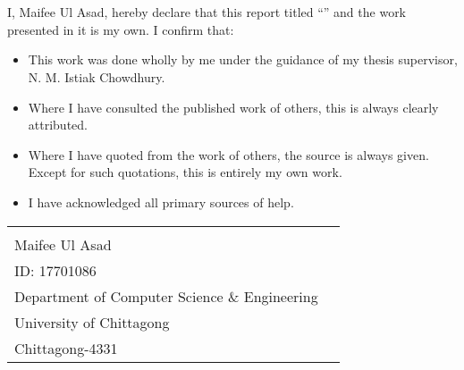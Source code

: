 

\chapter*{}

I, Maifee Ul Asad, hereby declare that this report titled “” and the work presented in it is my own. I confirm that:
\begin{itemize}
    \item This work was done wholly by me under the guidance of my thesis supervisor, N. M. Istiak Chowdhury.
    \item Where I have consulted the published work of others, this is always clearly attributed.
    \item Where I have quoted from the work of others, the source is always given. Except for such quotations, this is entirely my own work.
    \item I have acknowledged all primary sources of help.
\end{itemize}




\vspace*{\fill}

\begin{tabular}{@{}p{3.5in}p{2.5in}@{}}
  \hrulefill\\
  Maifee Ul Asad\\
  ID: 17701086\\
  Department of Computer Science \& Engineering\\
  University of Chittagong\\
  Chittagong-4331
\end{tabular}